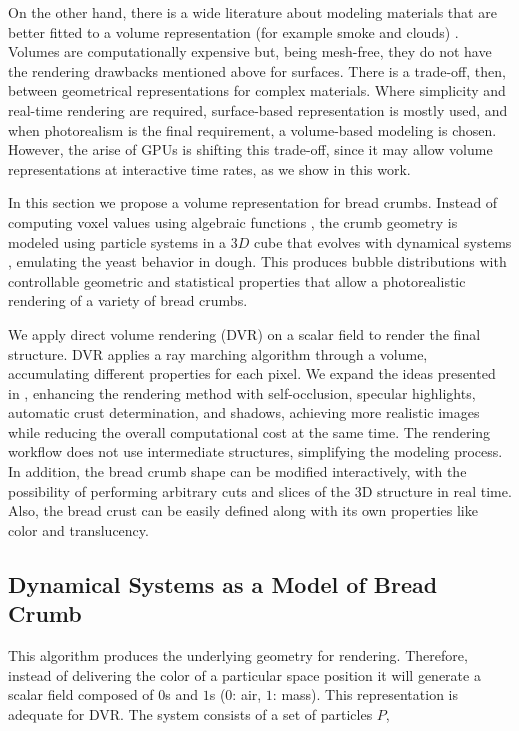On the other hand, there is a wide literature about modeling materials that are better fitted to a volume representation (for example smoke and clouds) \cite{Chentanez2011,Zhou2008}.
Volumes are computationally expensive but, being mesh-free, they do not have the rendering drawbacks mentioned above for surfaces.
There is a trade-off, then, between geometrical representations for complex materials.
Where simplicity and real-time rendering are required, surface-based representation is mostly used, and when photorealism is the final requirement, a volume-based modeling is chosen.
However, the arise of GPUs is shifting this trade-off, since it may allow volume representations at interactive time rates, as we show in this work.

In this section we propose a volume representation for bread crumbs.
Instead of computing voxel values using algebraic functions \cite{Perlin1989}, the crumb geometry is modeled using particle systems \cite{Reeves1983} in a $3D$ cube that evolves with dynamical systems \cite{Strogatz2001}, emulating the yeast behavior in dough.
This produces bubble distributions with controllable geometric and statistical properties that allow a photorealistic rendering of a variety of bread crumbs.

We apply direct volume rendering (DVR) \cite{Levoy1988,Kruger2003, Kratz2006} on a scalar field to render the final structure.
DVR applies a ray marching algorithm through a volume, accumulating different properties for each pixel.
We expand the ideas presented in \cite{Baravalle2014}, enhancing the rendering method with self-occlusion, specular highlights, automatic crust determination, and shadows, achieving more realistic images while reducing the overall computational cost at the same time.
The rendering workflow does not use intermediate structures, simplifying the modeling process.
In addition, the bread crumb shape can be modified interactively, with the possibility of performing arbitrary cuts and slices of the 3D structure in real time.
Also, the bread crust can be easily defined along with its own properties like color and translucency.

\subsection{Dynamical Systems as a Model of Bread Crumb}

This algorithm produces the underlying geometry for rendering.
Therefore, instead of delivering the color of a particular space position it will generate a scalar field composed of $0$s and $1$s ($0$: air, $1$: mass).
This representation is adequate for DVR.
The system consists of a set of particles $P$, 


